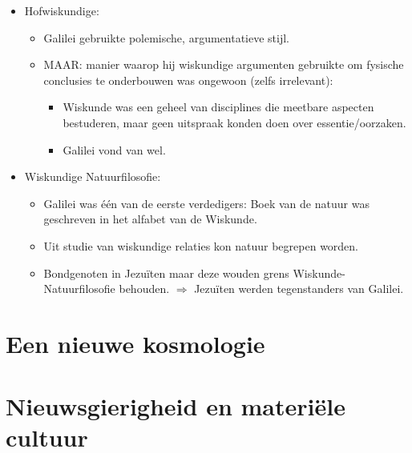 \documentclass{article}
\begin{document}
\begin{itemize}
      \item Hofwiskundige:
      \begin{itemize}
        \item Galilei gebruikte polemische, argumentatieve stijl.
        \item MAAR: manier waarop hij wiskundige argumenten gebruikte om fysische conclusies te onderbouwen was ongewoon (zelfs irrelevant):
        \begin{itemize}
          \item Wiskunde was een geheel van disciplines die meetbare aspecten bestuderen, maar geen uitspraak konden doen over essentie/oorzaken.
          \item Galilei vond van wel.
        \end{itemize}
      \end{itemize}
      \item Wiskundige Natuurfilosofie:
      \begin{itemize}
        \item Galilei was \'e\'en van de eerste verdedigers: Boek van de natuur was geschreven in het alfabet van de Wiskunde.
        \item Uit studie van wiskundige relaties kon natuur begrepen worden.
        \item Bondgenoten in Jezu\"iten maar deze wouden grens Wiskunde-Natuurfilosofie behouden. $\Rightarrow$ Jezu\"iten werden tegenstanders van Galilei.
      \end{itemize}
    \end{itemize}

  \newpage
  \section{Een nieuwe kosmologie}

  \newpage
  \section{Nieuwsgierigheid en materi\"ele cultuur}

  \newpage
\end{document}
